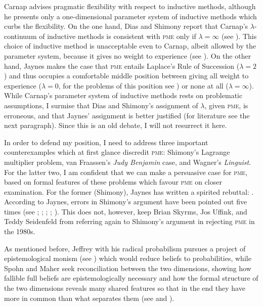 \documentclass[phd,12pt,oneside]{ubcthesis}
\begin{document}
Carnap advises pragmatic flexibility with respect to inductive
methods, although he presents only a one-dimensional parameter system
of inductive methods which curbs the flexibility. On the one hand,
Dias and Shimony report that Carnap's $\lambda$-continuum of inductive
methods is consistent with \textsc{pme} only if $\lambda=\infty$ (see
). This choice of inductive method is
unacceptable even to Carnap, albeit allowed by the parameter system,
because it gives no weight to experience (see
). On the other hand, Jaynes makes the case
that \textsc{pme} entails Laplace's Rule of Succession ($\lambda=2$)
and thus occupies a comfortable middle position between giving all
weight to experience ($\lambda=0$, for the problems of this position
see ) or none at all ($\lambda=\infty$).
While Carnap's parameter system of inductive methods rests on
problematic assumptions, I surmise that Dias and Shimony's assignment
of $\lambda$, given \textsc{pme}, is erroneous, and that Jaynes'
assignment is better justified (for literature see the next
paragraph). Since this is an old debate, I will not resurrect it here.

In order to defend my position, I need to address three important
counterexamples which at first glance discredit \textsc{pme}:
Shimony's Lagrange multiplier problem, van Fraassen's \emph{Judy
  Benjamin} case, and Wagner's \emph{Linguist}. For the latter two, I
am confident that we can make a persuasive case for \textsc{pme},
based on formal features of these problems which favour \textsc{pme}
on closer examination. For the former (Shimony), Jaynes has written a
spirited rebuttal:  . According to Jaynes, errors in
Shimony's argument have been pointed out five times (see
; ;
; ;
). This does not, however, keep Brian Skyrms,
Jos Uffink, and Teddy Seidenfeld from referring again to Shimony's
argument in rejecting \textsc{pme} in the 1980s.

As mentioned before, Jeffrey with his radical probabilism pursues a
project of epistemological monism (see ) which
would reduce beliefs to probabilities, while Spohn and Maher seek
reconciliation between the two dimensions, showing how fallible full
beliefs are epistemologically necessary and how the formal structure
of the two dimensions reveals many shared features so that in the end
they have more in common than what separates them (see
 and ).
\end{document}
